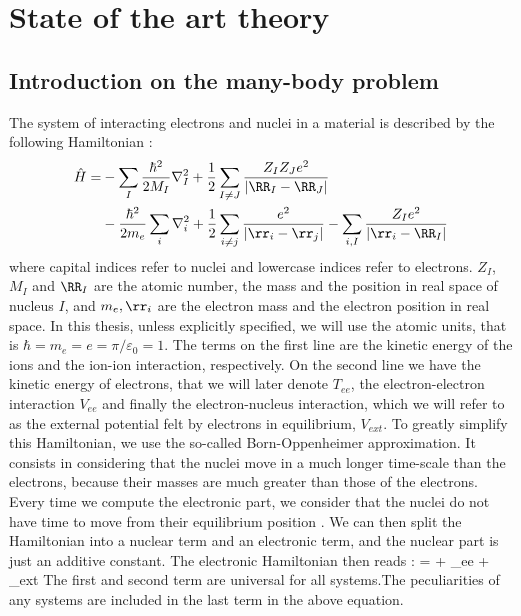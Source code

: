 \linenumbers
\chapter{ State of the art theory}
\chaptertoc{}

\section{Introduction on the many-body problem} \label{sec:BO_approx}
The system of interacting electrons and nuclei in a material is described by the following Hamiltonian :
\begin{align}
	\hat{H} = &- \sum_I \frac{\hbar^2}{2 M_I} \nabla^2_I + \frac{1}{2} \sum_{I\neq J} \frac{Z_I Z_J e^2}{\left| \RR_I - \RR_J \right|} \nonumber \\
	&- \frac{\hbar^2}{2m_e} \sum_i \nabla^2_i + \frac{1}{2} \sum_{i\neq j} \frac{e^2}{\left| \rr_i - \rr_j \right|} - \sum_{i,I} \frac{Z_I e^2}{\left|\rr_i - \RR_I \right|}
\end{align}
where capital indices refer to nuclei and lowercase indices refer to electrons. $Z_I$, $M_I$ and $\RR_I$ are the atomic number, the mass and the position in real space of nucleus $I$, and $m_e,\rr_i$ are the electron mass and the electron position in real space. In this thesis, unless explicitly specified, we will use the atomic units, that is $\hbar = m_e = e =\pi/\varepsilon_0 =1$.
The terms on the first line are the kinetic energy of the ions and the ion-ion interaction, respectively. On the second line we have the kinetic energy of electrons, that we will later denote $T_{ee}$, the electron-electron interaction $V_{ee}$ and finally the electron-nucleus interaction, which we will refer to as the external potential felt by electrons in equilibrium, $V_{ext}$. To greatly simplify this Hamiltonian, we use the so-called Born-Oppenheimer approximation. It consists in considering that the nuclei move in a much longer time-scale than the electrons, because their masses are much greater than those of the electrons. Every time we compute the electronic part, we consider that the nuclei do not have time to move from their equilibrium position \cite{monserrat2018electron}. We can then split the Hamiltonian into a nuclear term and an electronic term, and the nuclear part is just an additive constant. The electronic Hamiltonian then reads :
\be
	 =  + _{ee} + _{ext}
\ee
The first and second term are universal for all systems.The peculiarities of any systems are included in the last term in the above equation.

